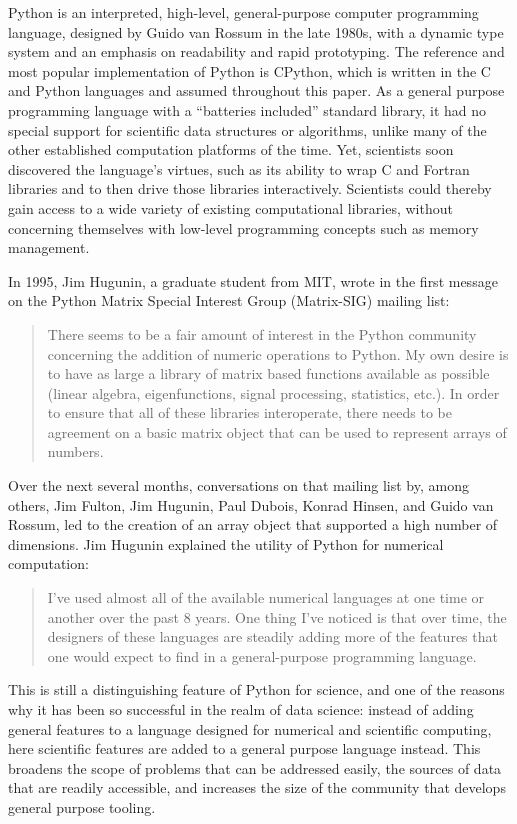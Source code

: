 \documentclass[fleqn,10pt]{wlscirep}
\begin{document}
Python is an interpreted, high-level, general-purpose computer programming
language, designed by Guido van Rossum in the late 1980s,
with a dynamic type system and an emphasis on readability and rapid prototyping.
The reference and most popular implementation of Python is 
CPython\cite{cpython-refman,cpython-source}, which is written
in the C and Python languages and assumed throughout this paper.
%
As a general purpose programming language with a ``batteries included''
standard library, it had no special support for scientific data
structures or algorithms, unlike many of the other established
computation platforms of the time. Yet, scientists soon discovered the
language's virtues, such as its ability to wrap C and Fortran
libraries and to then drive those libraries interactively.  Scientists
could thereby gain access to a wide variety of existing computational
libraries, without concerning themselves with low-level programming
concepts such as memory management.

In 1995, Jim Hugunin, a graduate student from MIT, wrote in the first
message on the Python Matrix Special Interest Group (Matrix-SIG)
mailing list\cite{Hugunin-first}:
\begin{quote}
There seems to be a fair amount of interest in the Python community
concerning the addition of numeric operations to Python.  My own desire is
to have as large a library of matrix based functions available as possible
(linear algebra, eigenfunctions, signal processing, statistics, etc.).  In
order to ensure that all of these libraries interoperate, there needs to
be agreement on a basic matrix object that can be used to represent arrays
of numbers.
\end{quote}
Over the next several months, conversations on that mailing
list by, among others, Jim Fulton, Jim Hugunin, Paul Dubois, Konrad
Hinsen, and Guido van Rossum, led to the creation of an array object
that supported a high number of dimensions.  Jim Hugunin explained the utility
of Python for numerical computation\cite{Hugunin-whitepaper}:
\begin{quote}
I've used almost all of the available numerical languages at one time
or another over the past 8 years. One thing I've noticed is that over
time, the designers of these languages are steadily adding more of the
features that one would expect to find in a general-purpose
programming language.
\end{quote}
This is still a distinguishing feature of Python for science, and one of the
reasons why it has been so successful in the realm of data science: instead of
adding general features to a language designed for numerical and scientific
computing, here scientific features are added to a general purpose language
instead.  This broadens the scope of problems that can be addressed easily, the
sources of data that are readily accessible, and increases the size of the
community that develops general purpose tooling.
\end{document}
